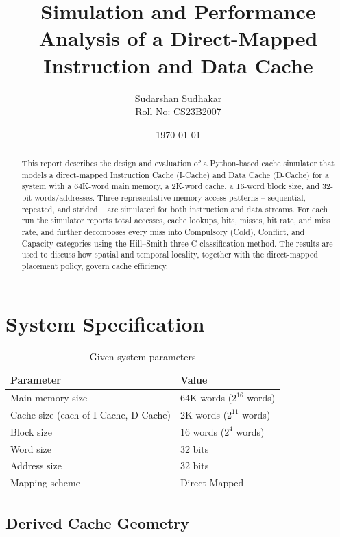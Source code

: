 \documentclass[11pt]{article}
\title{Simulation and Performance Analysis of a Direct-Mapped\\
Instruction and Data Cache}
\author{Sudarshan Sudhakar \\ Roll No: CS23B2007}
\date{\today}
\begin{document}
\maketitle

\begin{abstract}
This report describes the design and evaluation of a Python-based cache
simulator that models a direct-mapped Instruction Cache (I-Cache) and
Data Cache (D-Cache) for a system with a 64K-word main memory, a 2K-word
cache, a 16-word block size, and 32-bit words/addresses. Three
representative memory access patterns -- sequential, repeated, and
strided -- are simulated for both instruction and data streams. For each
run the simulator reports total accesses, cache lookups, hits, misses,
hit rate, and miss rate, and further decomposes every miss into
Compulsory (Cold), Conflict, and Capacity categories using the
Hill--Smith three-C classification method. The results are used to
discuss how spatial and temporal locality, together with the
direct-mapped placement policy, govern cache efficiency.
\end{abstract}

\tableofcontents

\section{System Specification}

\begin{table}[H]
\centering
\begin{tabular}{ll}
\toprule
Parameter & Value \\
\midrule
Main memory size       & 64K words ($2^{16}$ words) \\
Cache size (each of I-Cache, D-Cache) & 2K words ($2^{11}$ words) \\
Block size              & 16 words ($2^4$ words) \\
Word size               & 32 bits \\
Address size            & 32 bits \\
Mapping scheme          & Direct Mapped \\
\bottomrule
\end{tabular}
\caption{Given system parameters}
\end{table}

\subsection{Derived Cache Geometry}
\end{document}
